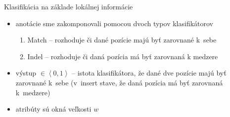 \documentclass[xcolor=dvipsnames, compress, 12pt]{beamer}
\theoremstyle{definition}
\begin{document}
\begin{frame}{Klasifikácia na základe lokálnej informácie}
\begin{itemize}
  \item anotácie sme zakomponovali pomocou dvoch typov klasifikátorov
  \begin{enumerate}
    \item Match -- rozhoduje či dané pozície majú byť zarovnané k~sebe
    \item Indel -- rozhoduje či daná pozícia má byť zarovnaná k medzere
  \end{enumerate}
  \item výstup $\in \left<0,1\right>$ -- istota klasifikátora, že dané dve pozície majú byť zarovnané k~sebe (v~insert stave, že daná pozícia má  byť zarovnaná k~medzere)
  \item atribúty sú okná veľkosti $w$
\end{itemize}
\end{frame}
\end{document}

